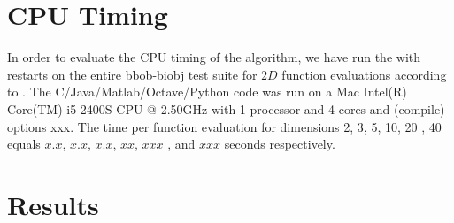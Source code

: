 \documentclass[sigconf]{acmart}
\newcommand{\change}[1]{{\color{red} #1}}
\begin{document}




\maketitle


%
%
%
\section{CPU Timing}
In order to evaluate the CPU timing of the algorithm, we have run the \change{\algname} with restarts on the entire bbob-biobj test suite \cite{biobj2016func} for $2 D$ function evaluations according to \cite{hansen2016exp}. The \change{C/Java/Matlab/Octave/Python} code was run on a \change{Mac Intel(R) Core(TM) i5-2400S CPU @ 2.50GHz} with \change{1} processor and \change{4} cores \change{and (compile) options xxx}. The time per function evaluation for dimensions 2, 3, 5, 10, 20\change{, 40} equals \change{$x.x$}, \change{$x.x$}, \change{$x.x$}, \change{$xx$}, \change{$xxx$}\change{, and $xxx$} seconds respectively. 


\section{Results}
\end{document}
